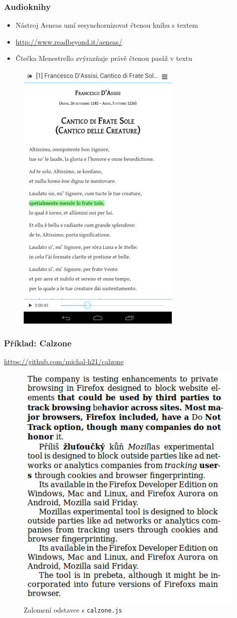 \documentclass[czech]{beamer}
\begin{document}
\begin{frame}
\frametitle{Audioknihy}
\begin{itemize}
  \item Nástroj Aeneas umí sesynchornizovat čtenou knihu s textem
  \item \url{http://www.readbeyond.it/aeneas/}
  \item Čtečka Menestrello zvýrazňuje právě čtenou pasáž v textu
\end{itemize}
\begin{figure}
  \includegraphics[width=.3\textwidth]{examples/menestrello.png}
\end{figure}
\end{frame}
\begin{frame}
        \frametitle{Příklad: Calzone }
\url{https://github.com/michal-h21/calzone}
\begin{figure}
  \includegraphics[width=.6\textwidth]{examples/with-calzone.png}
  \caption{Zalomení odstavce s \texttt{calzone.js}}
  \end{figure}
\end{frame}
\end{document}

